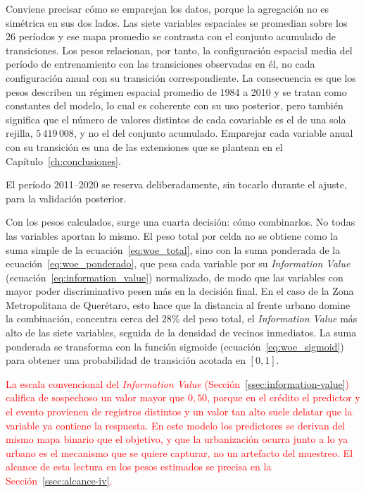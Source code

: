 Conviene precisar cómo se emparejan los datos, porque la agregación no es simétrica en sus dos lados. Las siete variables espaciales se promedian sobre los 26 períodos y ese mapa promedio se contrasta con el conjunto acumulado de transiciones. Los pesos relacionan, por tanto, la configuración espacial media del período de entrenamiento con las transiciones observadas en él, no cada configuración anual con su transición correspondiente. La consecuencia es que los pesos describen un régimen espacial promedio de 1984 a 2010 y se tratan como constantes del modelo, lo cual es coherente con su uso posterior, pero también significa que el número de valores distintos de cada covariable es el de una sola rejilla, $5\,419\,008$, y no el del conjunto acumulado. Emparejar cada variable anual con su transición es una de las extensiones que se plantean en el Capítulo~\ref{ch:conclusiones}.

El período 2011--2020 se reserva deliberadamente, sin tocarlo durante el ajuste, para la validación posterior.

Con los pesos calculados, surge una cuarta decisión: cómo combinarlos. No todas las variables aportan lo mismo. El peso total por celda no se obtiene como la suma simple de la ecuación~\ref{eq:woe_total}, sino con la suma ponderada de la ecuación~\ref{eq:woe_ponderado}, que pesa cada variable por su \textit{Information Value} (ecuación~\ref{eq:information_value}) normalizado, de modo que las variables con mayor poder discriminativo pesen más en la decisión final. En el caso de la Zona Metropolitana de Querétaro, esto hace que la distancia al frente urbano domine la combinación, concentra cerca del $28\%$ del peso total, el \textit{Information Value} más alto de las siete variables, seguida de la densidad de vecinos inmediatos. La suma ponderada se transforma con la función sigmoide (ecuación~\ref{eq:woe_sigmoid}) para obtener una probabilidad de transición acotada en $[0,1]$.

\textcolor{red}{La escala convencional del \textit{Information Value} (Sección~\ref{ssec:information-value}) califica de sospechoso un valor mayor que $0{,}50$, porque en el crédito el predictor y el evento provienen de registros distintos y un valor tan alto suele delatar que la variable ya contiene la respuesta. En este modelo los predictores se derivan del mismo mapa binario que el objetivo, y que la urbanización ocurra junto a lo ya urbano es el mecanismo que se quiere capturar, no un artefacto del muestreo. El alcance de esta lectura en los pesos estimados se precisa en la Sección~\ref{ssec:alcance-iv}.}

